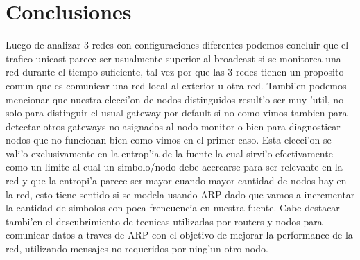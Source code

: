 \section{Conclusiones}
Luego de analizar 3 redes con configuraciones diferentes podemos concluir que el trafico unicast parece 
ser usualmente superior al broadcast si se monitorea una red durante el tiempo suficiente, tal vez por que las 3 redes tienen un proposito
comun que es comunicar una red local al exterior u otra red. Tambi'en podemos mencionar que nuestra elecci'on de nodos distinguidos result'o
ser muy 'util, no solo para distinguir el usual gateway por default si no como vimos tambien para detectar otros gateways no asignados al
nodo monitor o bien para diagnosticar nodos que no funcionan bien como vimos en el primer caso. Esta elecci'on se vali'o exclusivamente en la
entrop'ia de la fuente la cual sirvi'o efectivamente como un limite al cual un simbolo/nodo debe acercarse para ser relevante en la red y que la
entropi'a parece ser mayor cuando mayor cantidad de nodos hay en la red, esto tiene sentido si se modela usando ARP dado que vamos a incrementar
la cantidad de simbolos con poca frencuencia en nuestra fuente.
Cabe destacar tambi'en el descubrimiento de tecnicas utilizadas por routers y nodos para comunicar datos a traves de ARP con el objetivo
de mejorar la performance de la red, utilizando mensajes no requeridos por ning'un otro nodo.


